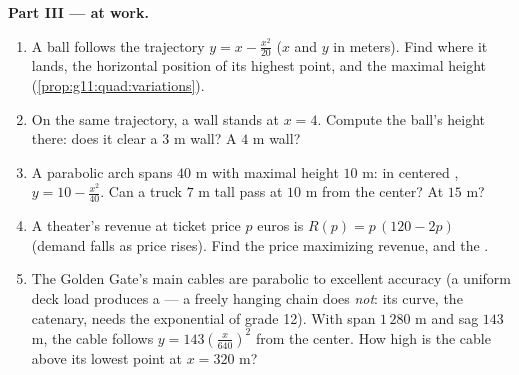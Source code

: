 \begin{problem}
\medskip
\noindent\textbf{Part III ---  at work.}
\begin{enumerate}[resume]
  \item A ball follows the trajectory
        $y = x - \frac{x^2}{20}$ ($x$ and $y$ in meters). Find
        where it lands, the horizontal position of its highest
        point, and the maximal height
        (\cref{prop:g11:quad:variations}).
  \item On the same trajectory, a wall stands at $x = 4$.
        Compute the ball's height there: does it clear a $3$ m
        wall? A $4$ m wall?
  \item A parabolic arch spans $40$ m with maximal height
        $10$ m: in centered ,
        $y = 10 - \frac{x^2}{40}$. Can a truck $7$ m tall pass
        at $10$ m from the center? At $15$ m?
  \item A theater's revenue at ticket price $p$ euros is
        $R(p) = p\,(120 - 2p)$ (demand falls as price rises).
        Find the price maximizing revenue, and the .
  \item The Golden Gate's main cables are parabolic to
        excellent accuracy (a uniform deck load produces a
         --- a freely hanging chain does \emph{not}: its
        curve, the catenary, needs the exponential of grade 12).
        With span $1\,280$ m and sag $143$ m, the cable follows
        $y = 143\left(\frac{x}{640}\right)^2$ from the center.
        How high is the cable above its lowest point at
        $x = 320$ m?
\end{enumerate}


\end{problem}
